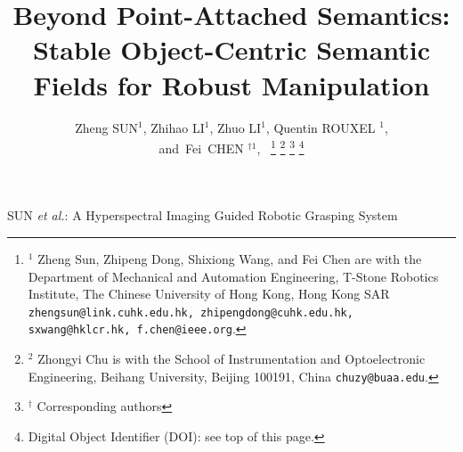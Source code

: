 \documentclass[letterpaper, 10 pt, journal, twoside]{IEEEtran}
\begin{document}
\title{Beyond Point-Attached Semantics: Stable Object-Centric Semantic Fields for Robust Manipulation}
\author{Zheng SUN$^{1}$, Zhihao LI$^{1}$, Zhuo LI$^{1}$, Quentin ROUXEL $^{1}$,\\and~Fei~CHEN $^{\dag 1}$,~
\thanks{
$^{1}$ Zheng Sun, Zhipeng Dong, Shixiong Wang, and Fei Chen are with the Department of Mechanical and Automation Engineering, T-Stone Robotics Institute, The Chinese University of Hong Kong, Hong Kong SAR {\tt \footnotesize zhengsun@link.cuhk.edu.hk, zhipengdong@cuhk.edu.hk,
sxwang@hklcr.hk, 
f.chen@ieee.org}.
}
\thanks{$^{2}$ Zhongyi Chu is with the School of Instrumentation and Optoelectronic Engineering, Beihang University, Beijing 100191, China  {\tt \footnotesize chuzy@buaa.edu}.}
\thanks{
$^{\dag}$ Corresponding authors
}
\thanks{Digital Object Identifier (DOI): see top of this page.}
}


{SUN \MakeLowercase{\textit{et al.}}: A Hyperspectral Imaging Guided Robotic Grasping System} 
\end{document}
